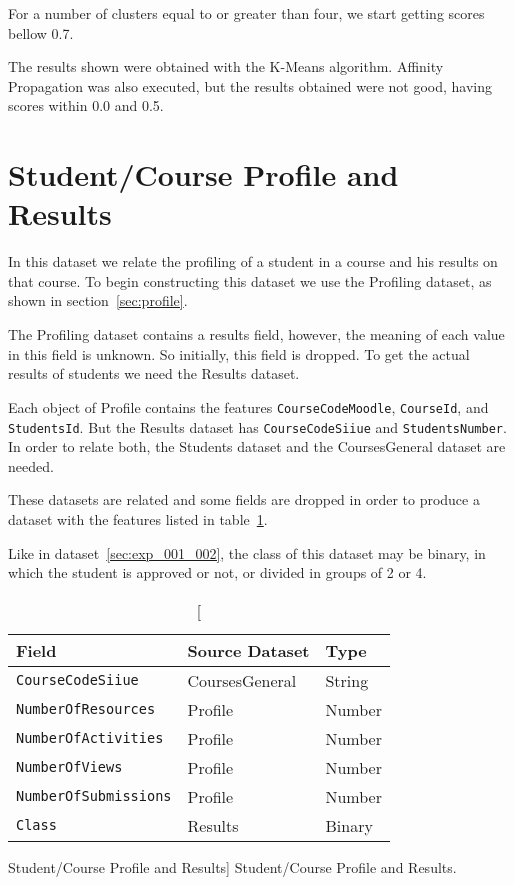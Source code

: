 For a number of clusters equal to or greater than four, we start getting scores
bellow 0.7.

The results shown were obtained with the K-Means algorithm. Affinity
Propagation was also executed, but the results obtained were not good, having
scores within 0.0 and 0.5.

\section{Student/Course Profile and Results}
\label{sec:exp_005_006}

In this dataset we relate the profiling of a student in a course and his
results on that course. To begin constructing this dataset we use the Profiling
dataset, as shown in section~\ref{sec:profile}.

The Profiling dataset contains a results field, however, the meaning of each
value in this field is unknown. So initially, this field is dropped. To get the
actual results of students we need the Results dataset.

Each object of Profile contains the features \texttt{CourseCodeMoodle},
\texttt{CourseId}, and \texttt{StudentsId}. But the Results dataset has
\texttt{CourseCodeSiiue} and \texttt{StudentsNumber}. In order to relate both,
the Students dataset and the CoursesGeneral dataset are needed.

These datasets are related and some fields are dropped in order to produce a
dataset with the features listed in table~\ref{tab:dat_003}.

Like in dataset~\ref{sec:exp_001_002}, the class of this dataset may be binary, in
which the student is approved or not, or divided in groups of 2 or 4.

\begin{table}[h!]
    \centering

    \begin{tabular}{| l | l | l |}
        \hline
        \textbf{Field}               & \textbf{Source Dataset} & \textbf{Type} \\ \hline
        \texttt{CourseCodeSiiue}     & CoursesGeneral          & String        \\ \hline
        \texttt{NumberOfResources}   & Profile                 & Number        \\ \hline
        \texttt{NumberOfActivities}  & Profile                 & Number        \\ \hline
        \texttt{NumberOfViews}       & Profile                 & Number        \\ \hline
        \texttt{NumberOfSubmissions} & Profile                 & Number        \\ \hline
        \texttt{Class}               & Results                 & Binary        \\ \hline
    \end{tabular}

    \caption
        [Student/Course Profile and Results]
        {Student/Course Profile and Results.}

    \label{tab:dat_003}
\end{table}

